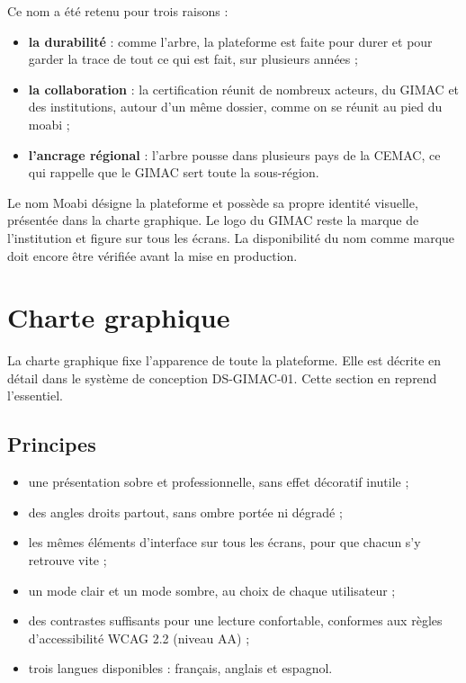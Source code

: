 \documentclass[12pt,a4paper]{article}
\begin{document}
Ce nom a été retenu pour trois raisons :
\begin{itemize}[leftmargin=1.2cm,itemsep=2pt]
\item \textbf{la durabilité} : comme l'arbre, la plateforme est faite pour durer et pour garder la trace de tout ce qui est fait, sur plusieurs années ;
\item \textbf{la collaboration} : la certification réunit de nombreux acteurs, du GIMAC et des institutions, autour d'un même dossier, comme on se réunit au pied du moabi ;
\item \textbf{l'ancrage régional} : l'arbre pousse dans plusieurs pays de la CEMAC, ce qui rappelle que le GIMAC sert toute la sous-région.
\end{itemize}

Le nom Moabi désigne la plateforme et possède sa propre identité visuelle, présentée dans la charte graphique. Le logo du GIMAC reste la marque de l'institution et figure sur tous les écrans. La disponibilité du nom comme marque doit encore être vérifiée avant la mise en production.

\section{Charte graphique}
La charte graphique fixe l'apparence de toute la plateforme. Elle est décrite en détail dans le système de conception DS-GIMAC-01. Cette section en reprend l'essentiel.

\subsection{Principes}
\begin{itemize}[leftmargin=1.2cm,itemsep=2pt]
\item une présentation sobre et professionnelle, sans effet décoratif inutile ;
\item des angles droits partout, sans ombre portée ni dégradé ;
\item les mêmes éléments d'interface sur tous les écrans, pour que chacun s'y retrouve vite ;
\item un mode clair et un mode sombre, au choix de chaque utilisateur ;
\item des contrastes suffisants pour une lecture confortable, conformes aux règles d'accessibilité WCAG 2.2 (niveau AA) ;
\item trois langues disponibles : français, anglais et espagnol.
\end{itemize}
\end{document}
